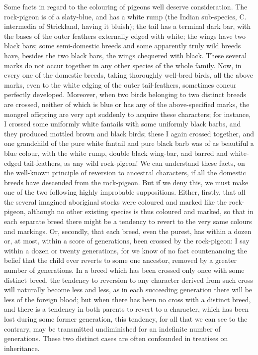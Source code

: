 \documentclass{book}
\begin{document}
Some facts in regard to the colouring of pigeons well deserve consideration.
The rock-pigeon is of a slaty-blue, and has a white rump (the Indian
sub-species, C. intermedia of Strickland, having it bluish); the tail has a
terminal dark bar, with the bases of the outer feathers externally edged with
white; the wings have two black bars; some semi-domestic breeds and some
apparently truly wild breeds have, besides the two black bars, the wings
chequered with black. These several marks do not occur together in any other
species of the whole family. Now, in every one of the domestic breeds, taking
thoroughly well-bred birds, all the above marks, even to the white edging of
the outer tail-feathers, sometimes concur perfectly developed. Moreover, when
two birds belonging to two distinct breeds are crossed, neither of which is
blue or has any of the above-specified marks, the mongrel offspring are very
apt suddenly to acquire these characters; for instance, I crossed some
uniformly white fantails with some uniformly black barbs, and they produced
mottled brown and black birds; these I again crossed together, and one
grandchild of the pure white fantail and pure black barb was of as beautiful a
blue colour, with the white rump, double black wing-bar, and barred and
white-edged tail-feathers, as any wild rock-pigeon! We can understand these
facts, on the well-known principle of reversion to ancestral characters, if all
the domestic breeds have descended from the rock-pigeon. But if we deny this,
we must make one of the two following highly improbable suppositions. Either,
firstly, that all the several imagined aboriginal stocks were coloured and
marked like the rock-pigeon, although no other existing species is thus
coloured and marked, so that in each separate breed there might be a tendency
to revert to the very same colours and markings. Or, secondly,
that each breed, even the purest, has within a dozen or, at most, within a
score of generations, been crossed by the rock-pigeon: I say within a dozen or
twenty generations, for we know of no fact countenancing the belief that the
child ever reverts to some one ancestor, removed by a greater number of
generations. In a breed which has been crossed only once with some distinct
breed, the tendency to reversion to any character derived from such cross will
naturally become less and less, as in each succeeding generation there will be
less of the foreign blood; but when there has been no cross with a distinct
breed, and there is a tendency in both parents to revert to a character, which
has been lost during some former generation, this tendency, for all that we can
see to the contrary, may be transmitted undiminished for an indefinite number
of generations. These two distinct cases are often confounded in treatises on
inheritance.
\end{document}
